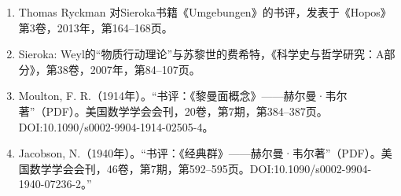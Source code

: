 \begin{enumerate}
\item Thomas Ryckman 对Sieroka书籍《Umgebungen》的书评，发表于《Hopos》第3卷，2013年，第164–168页。
\item Sieroka: Weyl的“物质行动理论”与苏黎世的费希特，《科学史与哲学研究：A部分》，第38卷，2007年，第84–107页。
\item Moulton, F. R.（1914年）。“书评：《黎曼面概念》——赫尔曼·韦尔著”（PDF）。美国数学学会会刊，20卷，第7期，第384–387页。DOI:10.1090/s0002-9904-1914-02505-4。
\item Jacobson, N.（1940年）。“书评：《经典群》——赫尔曼·韦尔著”（PDF）。美国数学学会会刊，46卷，第7期，第592–595页。DOI:10.1090/s0002-9904-1940-07236-2。”
\end{enumerate}
